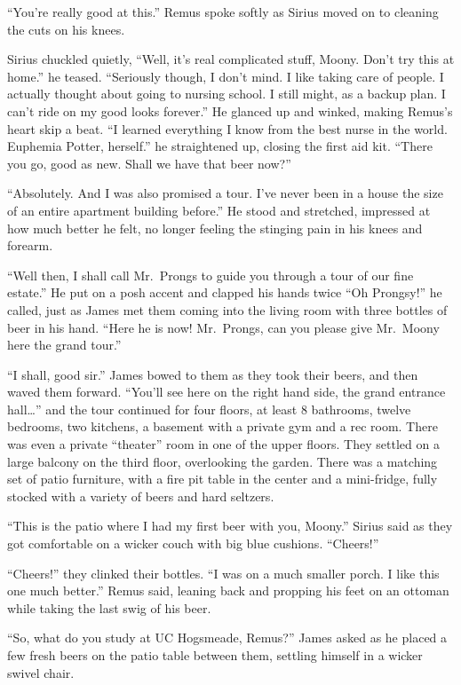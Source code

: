 \documentclass[12pt,twoside,openright]{memoir}
\begin{document}
``You're really good at this.'' Remus spoke softly as Sirius moved on to cleaning the cuts on his knees.

Sirius chuckled quietly, ``Well, it's real complicated stuff, Moony. Don't try this at home.'' he teased. ``Seriously though, I don't mind. I like taking care of people. I actually thought about going to nursing school. I still might, as a backup plan. I can't ride on my good looks forever.'' He glanced up and winked, making Remus's heart skip a beat. ``I learned everything I know from the best nurse in the world. Euphemia Potter, herself.'' he straightened up, closing the first aid kit. ``There you go, good as new. Shall we have that beer now?''

``Absolutely. And I was also promised a tour. I've never been in a house the size of an entire apartment building before.'' He stood and stretched, impressed at how much better he felt, no longer feeling the stinging pain in his knees and forearm.

``Well then, I shall call Mr.\ Prongs to guide you through a tour of our fine estate.'' He put on a posh accent and clapped his hands twice ``Oh Prongsy!'' he called, just as James met them coming into the living room with three bottles of beer in his hand. ``Here he is now! Mr.\ Prongs, can you please give Mr.\ Moony here the grand tour.''

``I shall, good sir.'' James bowed to them as they took their beers, and then waved them forward. ``You'll see here on the right hand side, the grand entrance hall…'' and the tour continued for four floors, at least 8 bathrooms, twelve bedrooms, two kitchens, a basement with a private gym and a rec room. There was even a private ``theater'' room in one of the upper floors. They settled on a large balcony on the third floor, overlooking the garden. There was a matching set of patio furniture, with a fire pit table in the center and a mini-fridge, fully stocked with a variety of beers and hard seltzers.

``This is the patio where I had my first beer with you, Moony.'' Sirius said as they got comfortable on a wicker couch with big blue cushions. ``Cheers!''

``Cheers!'' they clinked their bottles. ``I was on a much smaller porch. I like this one much better.'' Remus said, leaning back and propping his feet on an ottoman while taking the last swig of his beer.

``So, what do you study at UC Hogsmeade, Remus?'' James asked as he placed a few fresh beers on the patio table between them, settling himself in a wicker swivel chair.
\end{document}
